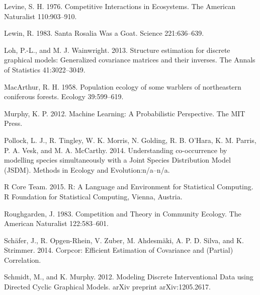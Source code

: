 \documentclass[12pt,]{article}
\begin{document}
\begin{spacing}{1.9}
\begin{flushleft}
Levine, S. H. 1976. Competitive Interactions in Ecosystems. The American
Naturalist 110:903--910.

Lewin, R. 1983. Santa Rosalia Was a Goat. Science 221:636--639.

Loh, P.-L., and M. J. Wainwright. 2013. Structure estimation for
discrete graphical models: Generalized covariance matrices and their
inverses. The Annals of Statistics 41:3022--3049.

MacArthur, R. H. 1958. Population ecology of some warblers of
northeastern coniferous forests. Ecology 39:599--619.

Murphy, K. P. 2012. Machine Learning: A Probabilistic Perspective. The
MIT Press.

Pollock, L. J., R. Tingley, W. K. Morris, N. Golding, R. B. O'Hara, K.
M. Parris, P. A. Vesk, and M. A. McCarthy. 2014. Understanding
co-occurrence by modelling species simultaneously with a Joint Species
Distribution Model (JSDM). Methods in Ecology and Evolution:n/a--n/a.

R Core Team. 2015. R: A Language and Environment for Statistical
Computing. R Foundation for Statistical Computing, Vienna, Austria.

Roughgarden, J. 1983. Competition and Theory in Community Ecology. The
American Naturalist 122:583--601.

Schäfer, J., R. Opgen-Rhein, V. Zuber, M. Ahdesmäki, A. P. D. Silva, and
K. Strimmer. 2014. Corpcor: Efficient Estimation of Covariance and
(Partial) Correlation.

Schmidt, M., and K. Murphy. 2012. Modeling Discrete Interventional Data
using Directed Cyclic Graphical Models. arXiv preprint arXiv:1205.2617.


\end{flushleft}
\end{spacing}
\end{document}
